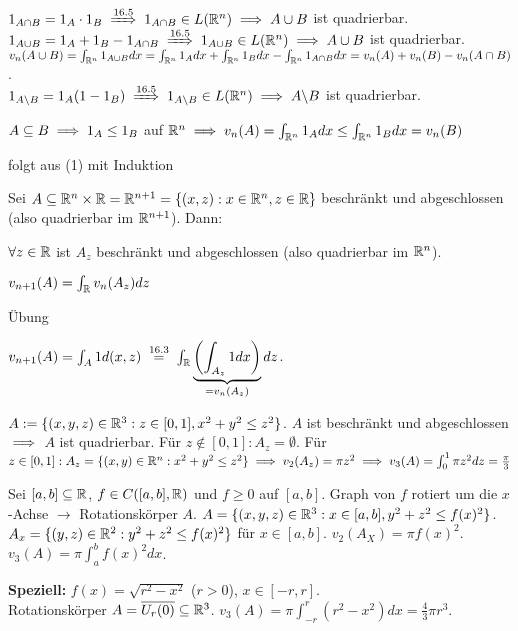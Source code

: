 \documentclass[a4paper,twoside,DIV15,BCOR12mm]{scrbook}
\begin{document}
\begin{beweise}
\item $1_{A\cap B} = 1_A \cdot 1_B \folgtnach{16.5} 1_{A \cap B} \in L(\MdR^n) \folgt A\cup B$ ist quadrierbar. \\
      $1_{A\cup B} = 1_A + 1_B -1_{A\cap B} \folgtnach{16.5} 1_{A \cup B} \in L(\MdR^n) \folgt A\cup B$ ist quadrierbar. $v_n(A\cup B) = \int_{\mathbb{R}^n}1_{A\cup B} dx = \int_{\mathbb{R}^n}1_A dx + \int_{\mathbb{R}^n}1_B dx - \int_{\mathbb{R}^n}1_{A\cap B}dx = v_n(A) + v_n(B) - v_n(A\cap B)$.\\
      $1_{A\backslash B} = 1_A(1-1_B) \folgtnach{16.5} 1_{A\backslash B}\in L(\MdR^n) \folgt A\backslash B$ ist quadrierbar.
\item $A\subseteq B \implies 1_A \le 1_B$ auf $\mathbb{R}^n \implies v_n(A) = \int_{\mathbb{R}^n}1_A dx \le \int_{\mathbb{R}^n}1_B dx = v_n(B)$
\item folgt aus (1) mit Induktion
\end{beweise}

\begin{satz}
Sei $A\subseteq \mathbb{R}^n\times \mathbb{R} = \mathbb{R}^{n+1} = \{(x,z): x\in\mathbb{R}^n, z\in\mathbb{R}\}$ beschränkt und abgeschlossen (also quadrierbar im $\mathbb{R}^{n+1}$). Dann:
\begin{liste}
\item $\forall z\in\mathbb{R}$ ist $A_z$ beschränkt und abgeschlossen (also quadrierbar im $\mathbb{R}^n$).
\item $v_{n+1}(A) = \int_{\mathbb{R}} v_n(A_z)dz$
\end{liste}
\end{satz}

\begin{beweise}
\item Übung
\item $v_{n+1}(A) = \int_A 1 d(x,z) \gleichnach{16.3} \int_\MdR \underbrace{ \left( \int_{A_z} 1dx\right)} _{=v_n(A_z)} dz$. 
\end{beweise}

\begin{beispiele}
\item $A:=\{(x,y,z)\in\mathbb{R}^3: z\in[0,1], x^2+y^2\le z^2\}$. $A$ ist beschränkt und abgeschlossen $\implies$ $A$ ist quadrierbar. Für $z\notin [0,1]: A_z = \emptyset$. Für $z \in [0,1]: A_z = \{(x,y)\in \mathbb{R}^n : x^2+y^2\le z^2\} \implies v_2(A_z) = \pi z^2 \implies v_3(A) = \int_0^1 \pi z^2 dz = \frac\pi 3$
\item Sei $[a,b]\subseteq \mathbb{R}$, $f\in C([a,b],\mathbb{R})$ und $f\ge 0$ auf $[a,b]$. Graph von $f$ rotiert um die $x$-Achse $\longrightarrow$ Rotationskörper $A$. $A=\{(x,y,z)\in\mathbb{R}^3: x\in[a,b], y^2+z^2\le f(x)^2\}$. $A_x = \{ (y,z)\in\mathbb{R}^2 : y^2+z^2\le f(x)^2\}$ für $x\in[a,b]$. $v_2(A_X) = \pi f(x)^2$. $v_3(A)=\pi \int_a^b f(x)^2 dx$.

\textbf{Speziell:} $f(x) = \sqrt{r^2-x^2}$ ($r>0$), $x\in[-r,r]$.\\ Rotationskörper $A=\overline{U_r(0)} \subseteq \mathbb{R}^3$. $v_3(A) = \pi\int _{-r}^r (r^2-x^2)dx = \frac 4 3 \pi r^3$.
\end{beispiele}
\end{document}
